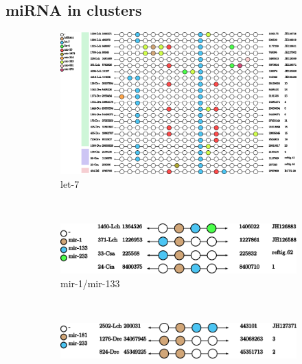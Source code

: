 \documentclass[graybox]{svmult}
\begin{document}
\subsection{miRNA in clusters}


\begin{figure}[ht!]
\centering
    \begin{subfigure}[t]{1.0\textwidth}
        \centering
        \includegraphics[height=9 cm]{./Images/Cluster_images/let-7_101_128}
        \caption{let-7}
    \end{subfigure}
    \\
    \begin{subfigure}[t]{0.45\textwidth}
        \centering
        \includegraphics[height=1.2 cm]{./Images/Cluster_images/mir-1_119_33}
        \caption{mir-1/mir-133}
     \end{subfigure}
        ~
     \\
    \begin{subfigure}[t]{0.45\textwidth}
        \centering
        \includegraphics[height=1.2 cm]{./Images/Cluster_images/mir-181_105_2502}

\end{subfigure}
\end{figure}
\end{document}
